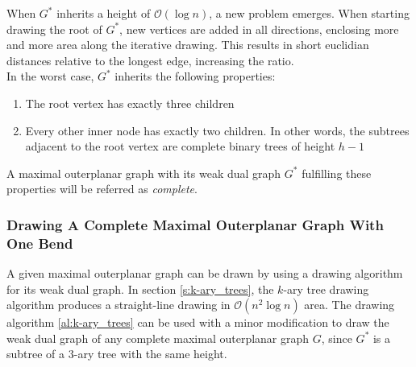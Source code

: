 When $G^*$ inherits a height of $\mathcal{O}(\log n)$, a new problem emerges. When starting drawing the root of $G^*$, new vertices are added in all directions, enclosing more and more area along the iterative drawing. This results in short euclidian distances relative to the longest edge, increasing the ratio.\\
In the worst case, $G^*$ inherits the following properties:
\begin{enumerate}
	\item The root vertex has exactly three children
	\item Every other inner node has exactly two children. In other words, the subtrees adjacent to the root vertex are complete binary trees of height $h-1$
\end{enumerate}
A maximal outerplanar graph with its weak dual graph $G^*$ fulfilling these properties will be referred as \emph{complete}.

\subsubsection{Drawing A Complete Maximal Outerplanar Graph With One Bend}

A given maximal outerplanar graph can be drawn by using a drawing algorithm for its weak dual graph. In section \ref{s:k-ary_trees}, the $k$-ary tree drawing algorithm produces a straight-line drawing in $\mathcal{O}(n^2 \log n)$ area. The drawing algorithm \ref{al:k-ary_trees} can be used with a minor modification to draw the weak dual graph of any complete maximal outerplanar graph $G$, since $G^*$ is a subtree of a $3$-ary tree with the same height.\\

